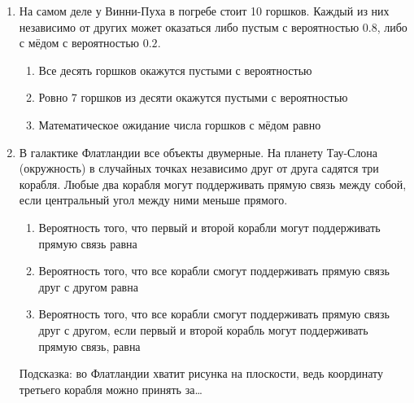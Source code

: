 \begin{enumerate}
\item На самом деле у Винни-Пуха в погребе стоит 10 горшков. Каждый из них независимо
от других может оказаться либо пустым с вероятностью $0.8$, либо с мёдом с вероятностью
$0.2$.
\begin{enumerate}
\item Все десять горшков окажутся пустыми с вероятностью \underline{\hspace{2cm}}
\item Ровно $7$ горшков из десяти окажутся пустыми с вероятностью \underline{\hspace{2cm}}
\item Математическое ожидание числа горшков с мёдом равно \underline{\hspace{2cm}}
\end{enumerate}

\item В галактике Флатландии все объекты двумерные. На планету Тау-Слона (окружность)
в случайных точках независимо друг от друга садятся три корабля. Любые два корабля
могут поддерживать прямую связь между собой, если центральный угол между ними меньше
прямого.
\begin{enumerate}
\item Вероятность того, что первый и второй корабли могут поддерживать прямую
связь равна \underline{\hspace{2cm}}
\item Вероятность того, что все корабли смогут поддерживать прямую связь друг
с другом равна \underline{\hspace{2cm}}
\item Вероятность того, что все корабли смогут поддерживать прямую связь друг
с другом, если первый и второй корабль могут поддерживать прямую связь, равна
\underline{\hspace{2cm}}
\end{enumerate}
Подсказка: во Флатландии хватит рисунка на плоскости, ведь координату третьего
корабля можно принять за\ldots


\end{enumerate}
